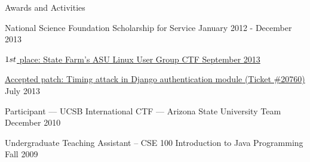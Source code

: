 \documentclass{resume} %
\begin{document}

\begin{rSection}{Awards and Activities}

\begin{asparaitem} \itemsep1pt \parskip0pt 
	\item National Science Foundation Scholarship for Service \hfill January 2012 - December 2013
	\item \href{http://asulug.org/2013/09/installfest-fall-2013-results/}{\($1$st\) place: State Farm’s ASU Linux User Group CTF \hfill September 2013}
	\item \href{https://code.djangoproject.com/ticket/20760}{Accepted patch: Timing attack in Django authentication module (Ticket \#20760)} \hfill July 2013
	\item Participant –-- UCSB International CTF –-- Arizona State University Team \hfill December 2010
	\item Undergraduate Teaching Assistant – CSE 100 Introduction to Java Programming \hfill Fall 2009
\end{asparaitem}

\end{rSection}





\end{document}
